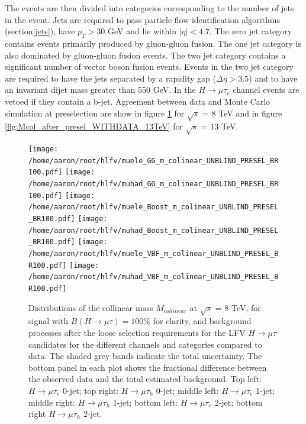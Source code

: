 \documentclass[oneside, letterpaper, oldfontcommands]{memoir}
\begin{document}
\qquad The events are then divided into categories corresponding to the number of jets in the event. Jets are required to pass particle flow identification algorithms (section\ref{jets}), have $p_{T} > 30$ GeV and lie within $|\eta| < 4.7$. The zero jet category contains events primarily produced by gluon-gluon fusion. The one jet category is also dominated by gluon-gluon fusion events. The two jet category contains a significant number of vector boson fusion events. Events in the two jet category are required to have the jets separated by a rapidity gap ($\Delta\eta > 3.5$) and to have an invariant dijet mass greater than 550 GeV. In the $H \rightarrow \mu\tau_{e}$ channel events are vetoed if they contain a b-jet. Agreement between data and Monte Carlo simulation at preselection are show in figure \ref{fig:Mcol_after_presel_WITHDATA} for $\sqrt{s}$ = 8 TeV and in figure \ref{fig:Mcol_after_presel_WITHDATA_13TeV} for $\sqrt{s}$ = 13 TeV.

\begin{figure}[hbtp]\centering
 \texttt{[image: /home/aaron/root/hlfv/muele\_GG\_m\_colinear\_UNBLIND\_PRESEL\_BR100.pdf]}
 \texttt{[image: /home/aaron/root/hlfv/muhad\_GG\_m\_colinear\_UNBLIND\_PRESEL\_BR100.pdf]}
 \texttt{[image: /home/aaron/root/hlfv/muele\_Boost\_m\_colinear\_UNBLIND\_PRESEL\_BR100.pdf]}
 \texttt{[image: /home/aaron/root/hlfv/muhad\_Boost\_m\_colinear\_UNBLIND\_PRESEL\_BR100.pdf]}
 \texttt{[image: /home/aaron/root/hlfv/muele\_VBF\_m\_colinear\_UNBLIND\_PRESEL\_BR100.pdf]}
 \texttt{[image: /home/aaron/root/hlfv/muhad\_VBF\_m\_colinear\_UNBLIND\_PRESEL\_BR100.pdf]}
 \caption{Distributions of the collinear mass $M_{collinear}$ at $\sqrt{s}$ = 8 TeV, for signal with $B(H \rightarrow \mu \tau )=100\%$ for clarity, and background processes after the loose selection requirements for the LFV $H \rightarrow \mu \tau$ candidates for the different channels and categories compared to data. The shaded grey bands indicate the total uncertainty. The bottom panel in each plot shows the fractional difference between the observed data and the total estimated background.  Top left: $H \rightarrow \mu \tau_{e}$ 0-jet; top right: $H \rightarrow \mu \tau_{h}$ 0-jet;  middle left: $H \rightarrow \mu \tau_{e}$ 1-jet; middle right: $H \rightarrow \mu \tau_{h}$
1-jet; bottom left: $H \rightarrow \mu \tau_{e}$ 2-jet; bottom right $H \rightarrow \mu \tau_{h}$ 2-jet. }
 \label{fig:Mcol_after_presel_WITHDATA}\end{figure}
\end{document}
